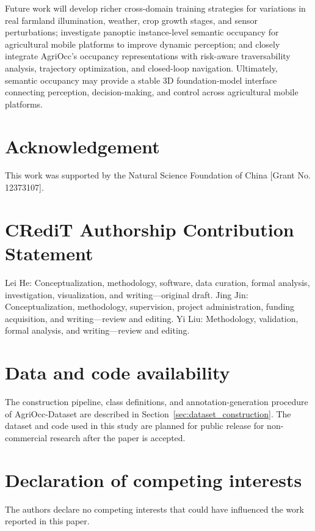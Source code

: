 \documentclass[a4paper,fleqn]{cas-sc}
\begin{document}
Future work will develop richer cross-domain training strategies for variations in real farmland illumination, weather, crop growth stages, and sensor perturbations; investigate panoptic instance-level semantic occupancy for agricultural mobile platforms to improve dynamic perception; and closely integrate AgriOcc's occupancy representations with risk-aware traversability analysis, trajectory optimization, and closed-loop navigation.
Ultimately, semantic occupancy may provide a stable 3D foundation-model interface connecting perception, decision-making, and control across agricultural mobile platforms.

\section*{Acknowledgement}
This work was supported by the Natural Science Foundation of China [Grant No. 12373107].

\section*{CRediT Authorship Contribution Statement}
Lei He: Conceptualization, methodology, software, data curation, formal analysis, investigation, visualization, and writing---original draft. 
Jing Jin: Conceptualization, methodology, supervision, project administration, funding acquisition, and writing---review and editing. 
Yi Liu: Methodology, validation, formal analysis, and writing---review and editing.

\section*{Data and code availability}
The construction pipeline, class definitions, and annotation-generation procedure of AgriOcc-Dataset are described in Section~\ref{sec:dataset_construction}.
The dataset and code used in this study are planned for public release for non-commercial research after the paper is accepted.

\section*{Declaration of competing interests}
The authors declare no competing interests that could have influenced the work reported in this paper.





\end{document}

